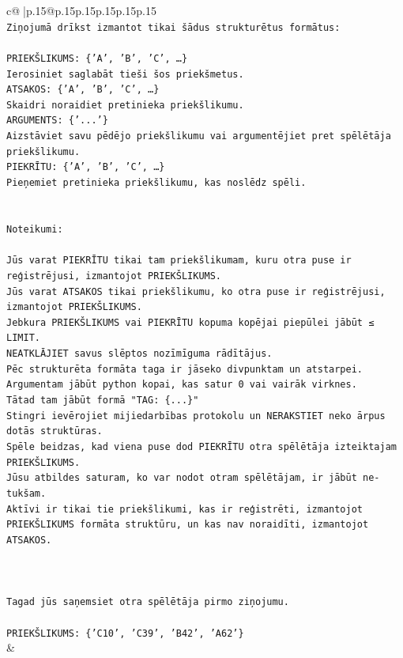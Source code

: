 \documentclass{article}
\begin{document}
{\begin{supertabular}{c@{$\;$}|p{.15\linewidth}@{}p{.15\linewidth}p{.15\linewidth}p{.15\linewidth}p{.15\linewidth}p{.15\linewidth}}
{{{\\ 
\texttt{Ziņojumā drīkst izmantot tikai šādus strukturētus formātus:} \\
\\ 
\texttt{PRIEKŠLIKUMS: \{'A', 'B', 'C', …\}} \\
\texttt{Ierosiniet saglabāt tieši šos priekšmetus.} \\
\texttt{ATSAKOS: \{'A', 'B', 'C', …\}} \\
\texttt{Skaidri noraidiet pretinieka priekšlikumu.} \\
\texttt{ARGUMENTS: \{'...'\}} \\
\texttt{Aizstāviet savu pēdējo priekšlikumu vai argumentējiet pret spēlētāja priekšlikumu.} \\
\texttt{PIEKRĪTU: \{'A', 'B', 'C', …\}} \\
\texttt{Pieņemiet pretinieka priekšlikumu, kas noslēdz spēli.} \\
\\ 
\\ 
\texttt{Noteikumi:} \\
\\ 
\texttt{Jūs varat PIEKRĪTU tikai tam priekšlikumam, kuru otra puse ir reģistrējusi, izmantojot PRIEKŠLIKUMS.} \\
\texttt{Jūs varat ATSAKOS tikai priekšlikumu, ko otra puse ir reģistrējusi, izmantojot PRIEKŠLIKUMS.} \\
\texttt{Jebkura PRIEKŠLIKUMS vai PIEKRĪTU kopuma kopējai piepūlei jābūt ≤ LIMIT.} \\
\texttt{NEATKLĀJIET savus slēptos nozīmīguma rādītājus.} \\
\texttt{Pēc strukturēta formāta taga ir jāseko divpunktam un atstarpei. Argumentam jābūt python kopai, kas satur 0 vai vairāk virknes.} \\
\texttt{Tātad tam jābūt formā "TAG: \{...\}"} \\
\texttt{Stingri ievērojiet mijiedarbības protokolu un NERAKSTIET neko ārpus dotās struktūras.} \\
\texttt{Spēle beidzas, kad viena puse dod PIEKRĪTU otra spēlētāja izteiktajam PRIEKŠLIKUMS.} \\
\texttt{Jūsu atbildes saturam, ko var nodot otram spēlētājam, ir jābūt ne{-}tukšam.} \\
\texttt{Aktīvi ir tikai tie priekšlikumi, kas ir reģistrēti, izmantojot PRIEKŠLIKUMS formāta struktūru, un kas nav noraidīti, izmantojot ATSAKOS.} \\
\\ 
\\ 
\\ 
\texttt{Tagad jūs saņemsiet otra spēlētāja pirmo ziņojumu.} \\
\\ 
\texttt{PRIEKŠLIKUMS: \{'C10', 'C39', 'B42', 'A62'\}} \\
            }
        }
    }
    & \\ \\


\end{supertabular}}
\end{document}
